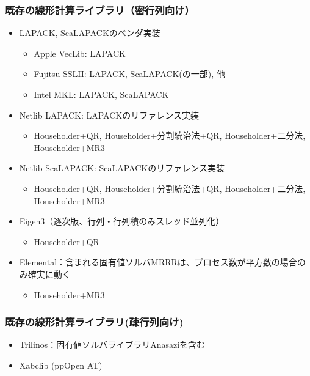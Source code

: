 \begin{frame}
  \frametitle{既存の線形計算ライブラリ（密行列向け）}
  \begin{itemize}
  \item LAPACK, ScaLAPACKのベンダ実装
    \begin{itemize}
    \item Apple VecLib: LAPACK
    \item Fujitsu SSLII: LAPACK, ScaLAPACK(の一部), 他
    \item Intel MKL: LAPACK, ScaLAPACK
    \end{itemize}
  \item Netlib LAPACK: LAPACKのリファレンス実装
    \begin{itemize}
      \item Householder+QR, Householder+分割統治法+QR, Householder+二分法, Householder+MR3
    \end{itemize}
  \item Netlib ScaLAPACK: ScaLAPACKのリファレンス実装
    \begin{itemize}
      \item Householder+QR, Householder+分割統治法+QR, Householder+二分法, Householder+MR3
    \end{itemize}
  \item Eigen3（逐次版、行列・行列積のみスレッド並列化）
    \begin{itemize}
      \item Householder+QR
    \end{itemize}
  \item Elemental：含まれる固有値ソルバMRRRは、プロセス数が平方数の場合のみ確実に動く
    \begin{itemize}
      \item Householder+MR3
    \end{itemize}
  \end{itemize}
\end{frame}

\begin{frame}
  \frametitle{既存の線形計算ライブラリ(疎行列向け)}
  \begin{itemize}
  \item Trilinos：固有値ソルバライブラリAnasaziを含む
  \item Xabclib (ppOpen AT)
  \end{itemize}
\end{frame}

